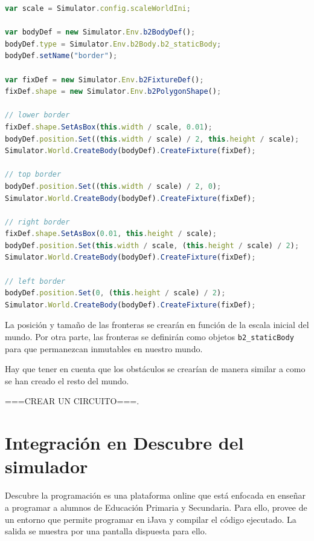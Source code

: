 \begin{lstlisting}[language={Javascript},label={code:creacion-fronteras}, caption={Función que crea las fronteras del mundo.}]
var scale = Simulator.config.scaleWorldIni;

var bodyDef = new Simulator.Env.b2BodyDef();
bodyDef.type = Simulator.Env.b2Body.b2_staticBody;
bodyDef.setName("border");

var fixDef = new Simulator.Env.b2FixtureDef();
fixDef.shape = new Simulator.Env.b2PolygonShape();

// lower border
fixDef.shape.SetAsBox(this.width / scale, 0.01);
bodyDef.position.Set((this.width / scale) / 2, this.height / scale);
Simulator.World.CreateBody(bodyDef).CreateFixture(fixDef);

// top border
bodyDef.position.Set((this.width / scale) / 2, 0);
Simulator.World.CreateBody(bodyDef).CreateFixture(fixDef);

// right border
fixDef.shape.SetAsBox(0.01, this.height / scale);
bodyDef.position.Set(this.width / scale, (this.height / scale) / 2);
Simulator.World.CreateBody(bodyDef).CreateFixture(fixDef);

// left border
bodyDef.position.Set(0, (this.height / scale) / 2);
Simulator.World.CreateBody(bodyDef).CreateFixture(fixDef);
\end{lstlisting}

La posición y tamaño de las fronteras se crearán en función de la escala inicial del mundo. Por otra parte, las fronteras se definirán como objetos \texttt{b2\_staticBody} para que permanezcan inmutables en nuestro mundo.

Hay que tener en cuenta que los obstáculos se crearían de manera similar a como se han creado el resto del mundo.

{\color{green} ===CREAR UN CIRCUITO===}.






\section{Integración en Descubre del simulador}
\label{sec:integracion-descubre}


Descubre la programación\cite{descubre} es una plataforma online que está enfocada en enseñar a programar a alumnos de Educación Primaria y Secundaria. Para ello, provee de un entorno que permite programar en iJava\cite{sanchez2009ijava} y compilar el código ejecutado. La salida se muestra por una pantalla dispuesta para ello.

